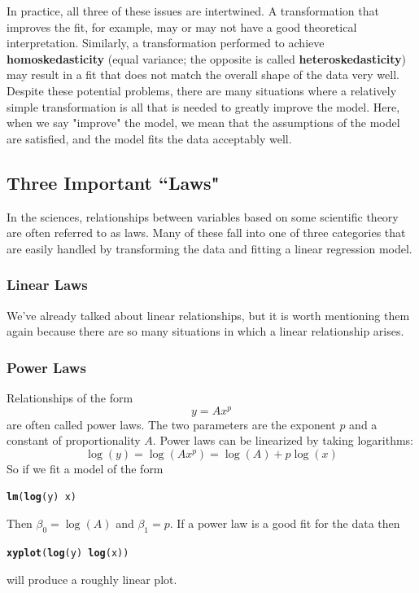 \documentclass[twoside]{book}\usepackage[]{graphicx}\usepackage[]{xcolor}
\makeatletter
\newcommand{\hlopt}[1]{\textcolor[rgb]{0,0,0}{#1}}%
\newcommand{\hlstd}[1]{\textcolor[rgb]{0.345,0.345,0.345}{#1}}%
\newcommand{\hlkwd}[1]{\textcolor[rgb]{0.737,0.353,0.396}{\textbf{#1}}}%
\newenvironment{kframe}{%
 \def\at@end@of@kframe{}%
 \ifinner\ifhmode%
  \def\at@end@of@kframe{\end{minipage}}%
  \begin{minipage}{\columnwidth}%
 \fi\fi%
 \def\FrameCommand##1{\hskip\@totalleftmargin \hskip-\fboxsep
 \colorbox{shadecolor}{##1}\hskip-\fboxsep
     \hskip-\linewidth \hskip-\@totalleftmargin \hskip\columnwidth}%
 \MakeFramed {\advance\hsize-\width
   \@totalleftmargin\z@ \linewidth\hsize
   \@setminipage}}%
 {\par\unskip\endMakeFramed%
 \at@end@of@kframe}
\newenvironment{knitrout}{}{} %
\def\myindex#1{\index{#1}}
\def\term#1{\textbf{#1}}
\newcounter{example}[section]
\makeatother
\begin{document}
In practice, all three of these issues are intertwined.  A transformation that
improves the fit, for example, may or may not have a good theoretical 
interpretation.  
Similarly, a transformation performed to achieve \term{homoskedasticity} 
\myindex{heteroskedasticity}%
\myindex{homoskedasticity}%
(equal variance; the opposite is called \term{heteroskedasticity}) 
may result in a fit that does not match the overall shape of the data very well.
Despite these potential problems, there are many situations where a relatively
simple transformation is all that is needed to greatly improve the model.  Here, when we say "improve" the model, we mean that the assumptions of the model are satisfied, and the model fits the data acceptably well.

\subsection{Three Important ``Laws"}
In the sciences, relationships between variables based on some scientific theory
are often referred to as laws.  Many of these fall into one of three categories that
are easily handled by transforming the data and fitting a linear regression model.

\subsubsection{Linear Laws}
We've already talked about linear relationships, but it is worth mentioning them again because there
are so many situations in which a linear relationship arises.

\subsubsection{Power Laws}

Relationships of the form 
\[ y = A x^p \]
are often called power laws.  The two parameters are the exponent $p$ and a constant of proportionality $A$.
Power laws can be linearized by taking logarithms:
\[ \log(y) = \log(A x^p) = \log(A) + p \log(x) \]
So if we fit a model of the form
\begin{knitrout}
\color{fgcolor}\begin{kframe}
\begin{alltt}
\hlkwd{lm}\hlstd{(} \hlkwd{log}\hlstd{(y)} \hlopt{~} \hlstd{x )}
\end{alltt}
\end{kframe}
\end{knitrout}
Then $\beta_0 = \log(A)$ and $\beta_1 = p$.  
If a power law is a good fit for the data then
\begin{knitrout}
\color{fgcolor}\begin{kframe}
\begin{alltt}
\hlkwd{xyplot}\hlstd{(} \hlkwd{log}\hlstd{(y)} \hlopt{~} \hlkwd{log}\hlstd{(x) )}
\end{alltt}
\end{kframe}
\end{knitrout}
will produce a roughly linear plot.
\end{document}
